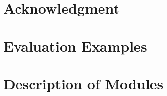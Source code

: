 \documentclass[conference]{IEEEtran}
\begin{document}
\section*{Acknowledgment}

\begin{appendices}

\section{Evaluation Examples}
\label{sec:evaluationExamples}


\section{Description of Modules}
\label{sec:descriptionOfModules}


\end{appendices}


{\small 
}
\end{document}
